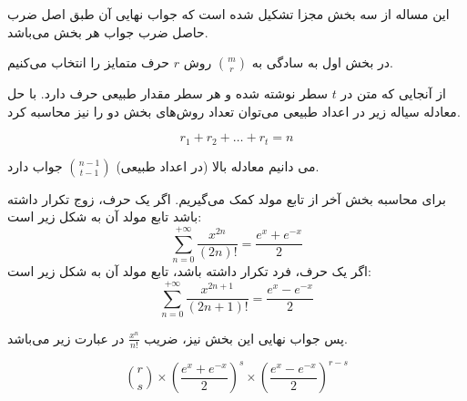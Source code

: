 \p
این مساله از سه بخش مجزا تشکیل شده است که جواب نهایی آن طبق اصل ضرب حاصل ضرب جواب هر بخش می‌باشد.

\p
در بخش اول به سادگی
به
$\binom{m}{r}$
روش $r$ حرف متمایز را انتخاب می‌کنیم.

\p
از آنجایی که متن در $t$ سطر نوشته شده و هر سطر مقدار طبیعی حرف دارد. با حل معادله سیاله زیر در اعداد طبیعی می‌توان تعداد روش‌های بخش دو را نیز محاسبه کرد.

$$r_1 + r_2 + \ldots + r_t = n$$

می دانیم معادله بالا (در اعداد طبیعی) 
$\binom{n - 1}{t - 1}$
جواب دارد.

\p
برای محاسبه بخش آخر از تابع مولد کمک می‌گیریم.
اگر یک حرف، زوج تکرار داشته باشد تابع مولد آن به شکل زیر است:
\[ \sum_{n=0}^{+\infty} \frac{x^{2n}}{(2n)!} = \frac{e^x + e^{-x}}{2} \]
اگر یک حرف، فرد تکرار داشته باشد، تابع مولد آن به شکل زیر است:
\[ \sum_{n=0}^{+\infty} \frac{x^{2n + 1}}{(2n + 1)!} = \frac{e^x - e^{-x}}{2} \]

\p
پس جواب نهایی این بخش نیز، ضریب
$\frac{x^n}{n!}$
در عبارت زیر می‌باشد.

\[ \binom{r}{s}\times\left({\frac{e^x + e^{-x}}{2}}\right)^s\times\left({\frac{e^x - e^{-x}}{2}}\right)^{r - s} \]